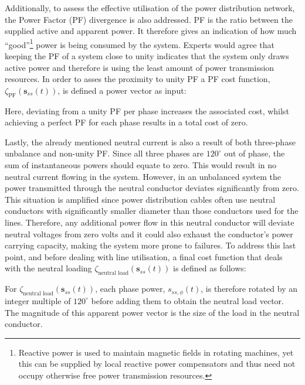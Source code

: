 Additionally, to assess the effective utilisation of the power distribution network, the Power Factor (PF) divergence is also addressed.
PF is the ratio between the supplied active and apparent power.
It therefore gives an indication of how much ``good''\footnote[1]{Reactive power is used to maintain magnetic fields in rotating machines, yet this can be supplied by local reactive power compensators and thus need not occupy otherwise free power transmission resources.} power is being consumed by the system.
Experts would agree that keeping the PF of a system close to unity indicates that the system only draws active power and therefore is using the least amount of power transmission resources.
In order to asses the proximity to unity PF a PF cost function, $\zeta_\text{PF}(\textbf{s}_{ss}(t))$, is defined a power vector as input:



Here, deviating from a unity PF per phase increases the associated cost, whilst achieving a perfect PF for each phase results in a total cost of zero.


Lastly, the already mentioned neutral current is also a result of both three-phase unbalance and non-unity PF.
Since all three phases are $120^\circ$ out of phase, the sum of instantaneous powers should equate to zero.
This would result in no neutral current flowing in the system.
However, in an unbalanced system the power transmitted through the neutral conductor deviates significantly from zero.
This situation is amplified since power distribution cables often use neutral conductors with significantly smaller diameter than those conductors used for the lines.
Therefore, any additional power flow in this neutral conductor will deviate neutral voltages from zero volts and it could also exhaust the conductor's power carrying capacity, making the system more prone to failures.
To address this last point, and before dealing with line utilisation, a final cost function that deals with the neutral loading $\zeta_\text{neutral load}(\textbf{s}_{ss}(t))$ is defined as follows:



For $\zeta_\text{neutral load}(\textbf{s}_{ss}(t))$, each phase power, $s_{ss,\phi}(t)$, is therefore rotated by an integer multiple of $120^\circ$ before adding them to obtain the neutral load vector.
The magnitude of this apparent power vector is the size of the load in the neutral conductor.

